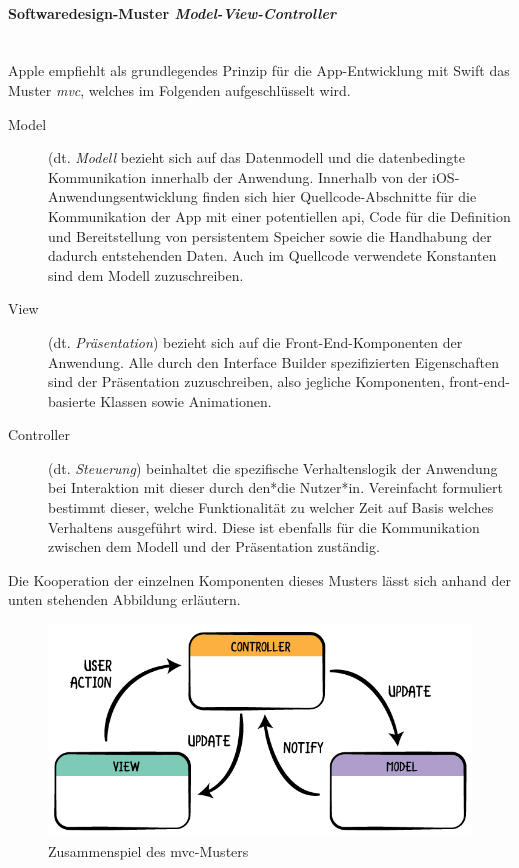 \paragraph{Softwaredesign-Muster \textit{Model-View-Controller}}\mbox{}\\ 
Apple empfiehlt als grundlegendes Prinzip für die App-Entwicklung mit Swift das Muster \textit{\ac{mvc}}, welches im Folgenden aufgeschlüsselt wird.

\begin{description}
	\item[Model] (dt. \textit{Modell} bezieht sich auf das Datenmodell und die datenbedingte Kommunikation innerhalb der Anwendung. Innerhalb von der iOS-Anwendungsentwicklung finden sich hier Quellcode-Abschnitte für die Kommunikation der App mit einer potentiellen \acs{api}, Code für die Definition und Bereitstellung von persistentem Speicher sowie die Handhabung der dadurch entstehenden Daten. Auch im Quellcode verwendete Konstanten sind dem Modell zuzuschreiben.
	\item[View] (dt. \textit{Präsentation}) bezieht sich auf die Front-End-Komponenten der Anwendung. Alle durch den Interface Builder spezifizierten Eigenschaften sind der Präsentation zuzuschreiben, also jegliche Komponenten, front-end-basierte Klassen sowie Animationen.
	\item[Controller] (dt. \textit{Steuerung}) beinhaltet die spezifische Verhaltenslogik der Anwendung bei Interaktion mit dieser durch den*die Nutzer*in. Vereinfacht formuliert bestimmt dieser, welche Funktionalität zu welcher Zeit auf Basis welches Verhaltens ausgeführt wird. Diese ist ebenfalls für die Kommunikation zwischen dem Modell und der Präsentation zuständig.
\end{description}

Die Kooperation der einzelnen Komponenten dieses Musters lässt sich anhand der unten stehenden Abbildung erläutern.

\begin{figure}[h!]
	\centering
	\includegraphics[width=0.5\linewidth]{img/mvc}
	\caption{Zusammenspiel des \ac{mvc}-Musters}
\end{figure}

